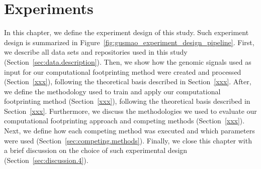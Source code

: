 \chapter{Experiments}
\label{cha:experiments}

\graphicspath{{chapter4/figs/}}

In this chapter, we define the experiment design of this study. Such experiment design is summarized in Figure~\ref{fig:gusmao_experiment_design_pipeline}. First, we describe all data sets and repositories used in this study (Section~\ref{sec:data.description}). Then, we show how the genomic signals used as input for our computational footprinting method were created and processed (Section~\ref{xxx}), following the theoretical basis described in Section~\ref{xxx}. After, we define the methodology used to train and apply our computational footprinting method (Section~\ref{xxx}), following the theoretical basis described in Section~\ref{xxx}. Furthermore, we discuss the methodologies we used to evaluate our computational footprinting approach and competing methods (Section~\ref{xxx}). Next, we define how each competing method was executed and which parameters were used (Section~\ref{sec:competing.methods}). Finally, we close this chapter with a brief discussion on the choice of such experimental design (Section~\ref{sec:discussion.4}).

